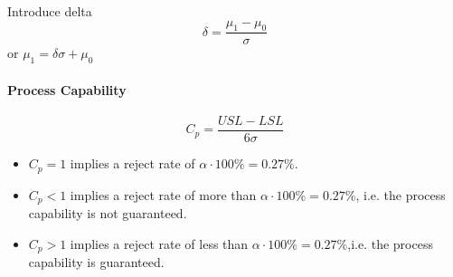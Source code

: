 Introduce delta
\begin{equation}
  \delta = \frac{\mu_1 - \mu_0}{\sigma}
\end{equation}
or $\mu_1 = \delta\sigma + \mu_0$


\paragraph{Process Capability}
\begin{equation}
  C_p = \frac{USL - LSL}{6\sigma}
\end{equation}

\begin{itemize}
  \item $C_p = 1$ implies a reject rate of $\alpha \cdot 100\% = 0.27\%$.
  \item $C_p < 1$ implies a reject rate of more than $\alpha \cdot 100\% = 0.27\%$, i.e. the process capability is not guaranteed.
  \item $C_p > 1$ implies a reject rate of less than $\alpha \cdot 100\% = 0.27\%$,i.e. the process capability is guaranteed.

\end{itemize}
